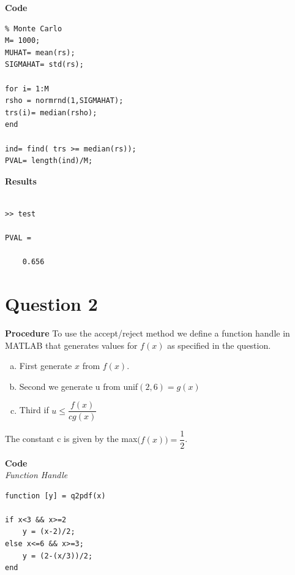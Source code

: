 \documentclass[12pt,a4paper]{article}
\begin{document}
\textbf{Code}\\
\begin{verbatim}
% Monte Carlo
M= 1000;
MUHAT= mean(rs);
SIGMAHAT= std(rs);

for i= 1:M
rsho = normrnd(1,SIGMAHAT);
trs(i)= median(rsho);
end

ind= find( trs >= median(rs));
PVAL= length(ind)/M;
\end{verbatim}

\textbf{Results}\

\begin{verbatim}

>> test

PVAL =

    0.656
\end{verbatim}

\clearpage

\section*{Question 2}

\textbf{Procedure}
To use the accept/reject method we define a function handle in MATLAB that generates values for $f(x)$ as specified in the question.

\begin{enumerate}[a.]

\item{
First generate $x$ from $f(x)$.
}

\item{

Second we generate u from unif$(2,6)=g(x)$

}

\item{

Third if $u\leq\dfrac{f(x)}{cg(x)}$
}

\end{enumerate}

The constant c is given by the max$\biggr(f(x)\biggr)=\dfrac{1}{2}$. 

\textbf{Code}\\
\textit{Function Handle}
\begin{verbatim}
function [y] = q2pdf(x)

if x<3 && x>=2
    y = (x-2)/2;
else x<=6 && x>=3;
    y = (2-(x/3))/2;
end
\end{verbatim}
\end{document}
